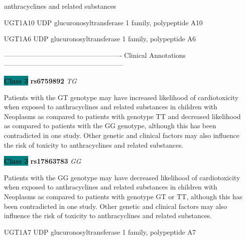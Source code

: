 \documentclass{resume} %
\begin{document}
\begin{rSection}{ anthracyclines and related substances }
\begin{rSubsection}{ UGT1A10 }{ UDP glucuronosyltransferase 1 family, polypeptide A10 }{}{}
\end{rSubsection}\begin{rSubsection}{ UGT1A6 }{ UDP glucuronosyltransferase 1 family, polypeptide A6 }{}{}
\item[]

\item[] ---------------------------------------------------- Clinical Annotations -----------------------------------------------------\newline
\item \textbf{\colorbox{teal} {Class 3}} \textbf{ rs6759892 } \textit{ TG }
\item[] Patients with the GT genotype may have increased likelihood of cardiotoxicity when exposed to anthracyclines and related substances in children with Neoplasms as compared to patients with genotype TT and decreased likelihood as compared to patients with the GG genotype, although this has been contradicted in one study. Other genetic and clinical factors may also influence the risk of toxicity to anthracyclines and related substances. \item \textbf{\colorbox{teal} {Class 3}} \textbf{ rs17863783 } \textit{ GG }
\item[] Patients with the GG genotype may have decreased likelihood of cardiotoxicity when exposed to anthracyclines and related substances in children with Neoplasms as compared to patients with genotype GT or TT, although this has been contradicted in one study. Other genetic and clinical factors may also influence the risk of toxicity to anthracyclines and related substances.

\end{rSubsection}\begin{rSubsection}{ UGT1A7 }{ UDP glucuronosyltransferase 1 family, polypeptide A7 }{}{}
\item[]


\end{rSubsection}
\end{rSection}
\end{document}
